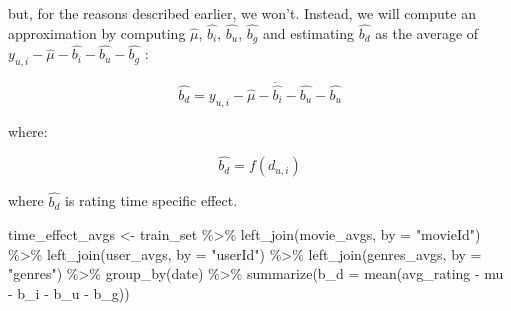 \documentclass[
]{article}
\newenvironment{Shaded}{}{}
\newcommand{\AttributeTok}[1]{\textcolor[rgb]{0.49,0.56,0.16}{#1}}
\newcommand{\FunctionTok}[1]{\textcolor[rgb]{0.02,0.16,0.49}{#1}}
\newcommand{\NormalTok}[1]{#1}
\newcommand{\OtherTok}[1]{\textcolor[rgb]{0.00,0.44,0.13}{#1}}
\newcommand{\SpecialCharTok}[1]{\textcolor[rgb]{0.25,0.44,0.63}{#1}}
\newcommand{\StringTok}[1]{\textcolor[rgb]{0.25,0.44,0.63}{#1}}
\begin{document}
but, for the reasons described earlier, we won't. Instead, we will
compute an approximation by computing \(\hat{\mu}\), \(\hat{b_{i}}\),
\(\hat{b_{u}}\), \(\hat{b_{g}}\) and estimating \(\hat{b_{d}}\) as the
average of \(y_{u,i}-\hat{\mu}-\hat{b_{i}}-\hat{b_{u}}-\hat{b_{g}}\) :\\

%
\par

\label{eq:EqModel5-3} \begin{equation}
  \hat{b_{d}} = \overline{y_{u,i} - \hat{\mu} - \hat{b_{i}} - \hat{b_{u}}  - \hat{b_{u}}}
\end{equation}

where:

%
\par

\label{eq:EqModel5-4} \begin{equation}
  \hat{b_{d}} = f(d_{u,i})
\end{equation}

where \(\hat{b_{d}}\) is rating time specific effect.

\begin{Shaded}
\begin{Highlighting}[]
\NormalTok{time\_effect\_avgs }\OtherTok{\textless{}{-}}\NormalTok{ train\_set }\SpecialCharTok{\%\textgreater{}\%} \FunctionTok{left\_join}\NormalTok{(movie\_avgs, }\AttributeTok{by =} \StringTok{"movieId"}\NormalTok{) }\SpecialCharTok{\%\textgreater{}\%} 
    \FunctionTok{left\_join}\NormalTok{(user\_avgs, }\AttributeTok{by =} \StringTok{"userId"}\NormalTok{) }\SpecialCharTok{\%\textgreater{}\%} \FunctionTok{left\_join}\NormalTok{(genres\_avgs, }
    \AttributeTok{by =} \StringTok{"genres"}\NormalTok{) }\SpecialCharTok{\%\textgreater{}\%} \FunctionTok{group\_by}\NormalTok{(date) }\SpecialCharTok{\%\textgreater{}\%} \FunctionTok{summarize}\NormalTok{(}\AttributeTok{b\_d =} \FunctionTok{mean}\NormalTok{(avg\_rating }\SpecialCharTok{{-}} 
\NormalTok{    mu }\SpecialCharTok{{-}}\NormalTok{ b\_i }\SpecialCharTok{{-}}\NormalTok{ b\_u }\SpecialCharTok{{-}}\NormalTok{ b\_g))}
\end{Highlighting}
\end{Shaded}
\end{document}
